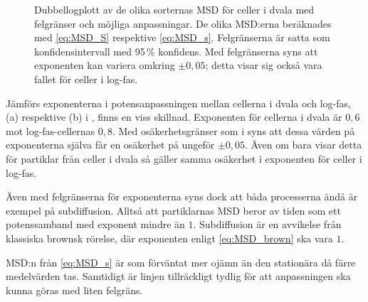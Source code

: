 \begin{figure}\centerline{
\subfigure[][]{

}
\subfigure[][]{

}}
\caption{Dubbellogplott av de olika sorternas MSD för celler i dvala med felgränser och möjliga anpassningar. De olika MSD:erna beräknades med \eqref{eq:MSD_S} respektive \eqref{eq:MSD_s}. Felgränserna är satta som konfidensintervall med 95\,\% konfidens. Med felgränserna syns att exponenten kan variera omkring $\pm 0,05$; detta visar sig också vara fallet för celler i log-fas.}
\label{fig:MSD_error}
\end{figure}


Jämförs exponenterna i potensanpassningen mellan cellerna i dvala och log-fas, (a) respektive (b) i , finns en viss skillnad. Exponenten för cellerna i dvala är $0,6$ mot log-fas-cellernas $0,8$. Med osäkerhetsgränser som i  syns att dessa värden på exponenterna själva får en osäkerhet på ungeför $\pm 0,05$. Även om  bara visar detta för partiklar från celler i dvala så gäller samma osäkerhet i exponenten för celler i log-fas.

Även med felgränserna för exponenterna syns dock att båda processerna ändå är exempel på subdiffusion. Alltså att partiklarnas MSD beror av tiden som ett potenssamband med exponent mindre än $1$. Subdiffusion är en avvikelse från klassiska brownsk rörelse, där exponenten enligt \eqref{eq:MSD_brown} ska vara $1$. 


MSD:n från \eqref{eq:MSD_s} är som förväntat mer ojämn än den stationära då färre medelvärden tas. Samtidigt är linjen tillräckligt tydlig för att anpassningen ska kunna göras med liten felgräns.



\begin{comment}
\section{Spektraltäthet}
\todo[color=lime]{för position eller steg?}

\todo[inline]{Mer kommer sen.}

\subsection{Resultat -- }
\end{comment}






